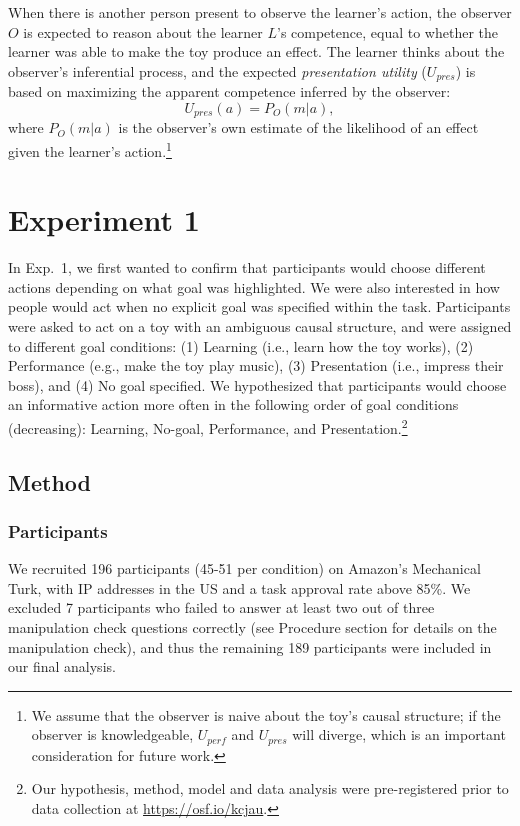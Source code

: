 \documentclass[10pt, letterpaper]{article}
\begin{document}
When there is another person present to observe the learner's action,
the observer \(O\) is expected to reason about the learner \(L\)'s
competence, equal to whether the learner was able to make the toy
produce an effect. The learner thinks about the observer's inferential
process, and the expected \emph{presentation utility} (\(U_{pres}\)) is
based on maximizing the apparent competence inferred by the observer:
\[ U_{pres}(a) = P_O(m | a),\] \noindent where \(P_O(m | a)\) is the
observer's own estimate of the likelihood of an effect given the
learner's action.\footnote{We assume that the observer is naive about
  the toy's causal structure; if the observer is knowledgeable,
  \(U_{perf}\) and \(U_{pres}\) will diverge, which is an important
  consideration for future work.}

\hypertarget{experiment-1}{%
\section{Experiment 1}\label{experiment-1}}

In Exp.~1, we first wanted to confirm that participants would choose
different actions depending on what goal was highlighted. We were also
interested in how people would act when no explicit goal was specified
within the task. Participants were asked to act on a toy with an
ambiguous causal structure, and were assigned to different goal
conditions: (1) Learning (i.e., learn how the toy works), (2)
Performance (e.g., make the toy play music), (3) Presentation (i.e.,
impress their boss), and (4) No goal specified. We hypothesized that
participants would choose an informative action more often in the
following order of goal conditions (decreasing): Learning, No-goal,
Performance, and
Presentation.\footnote{Our hypothesis, method, model and data analysis were pre-registered prior to data collection at \url{https://osf.io/kcjau}.}

\hypertarget{method}{%
\subsection{Method}\label{method}}

\hypertarget{participants}{%
\subsubsection{Participants}\label{participants}}

We recruited 196 participants (45-51 per condition) on Amazon's
Mechanical Turk, with IP addresses in the US and a task approval rate
above 85\%. We excluded 7 participants who failed to answer at least two
out of three manipulation check questions correctly (see Procedure
section for details on the manipulation check), and thus the remaining
189 participants were included in our final analysis.
\end{document}
